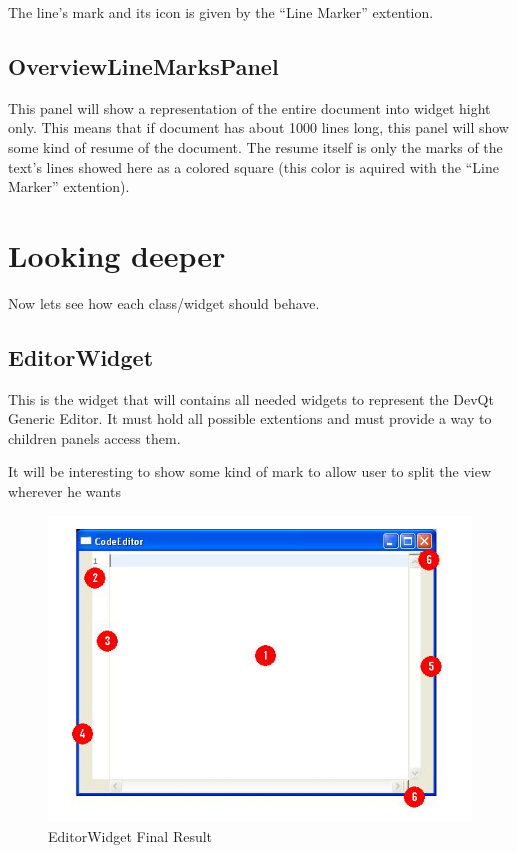 \documentclass[11pt,a4paper]{report}
\begin{document}
The line's mark and its icon is given by the ``Line Marker'' extention.

\section{OverviewLineMarksPanel}
This panel will show a representation of the entire document into widget hight only. This means that if document has about 1000 lines long, this panel will show some kind of resume of the document. The resume itself is only the marks of the text's lines showed here as a colored square (this color is aquired with the ``Line Marker'' extention).

\chapter{Looking deeper}
Now lets see how each class/widget should behave.

\section{EditorWidget}
This is the widget that will contains all needed widgets to represent the DevQt Generic Editor. It must hold all possible extentions and must provide a way to children panels access them.

It will be interesting to show some kind of mark to allow user to split the view wherever he wants

\begin{figure}[hbt]
\centering
\includegraphics{images/screenshot.jpg}
\caption{EditorWidget Final Result} \label{screenshot}
\end{figure}
\end{document}
